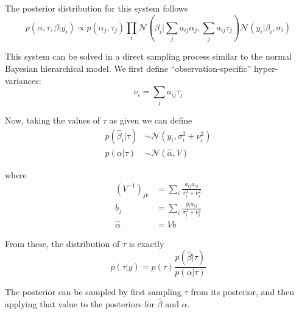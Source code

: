 \documentclass[12pt, oneside]{amsart}
\begin{document}
The posterior distribution for this system follows
\[
p(\alpha, \tau, \beta | y_i) \propto
p(\alpha_j, \tau_j) \prod_i \mathcal{N}\left(\beta_i | \sum_j
  a_{ij} \alpha_j, \sum_j a_{ij} \tau_j\right)
\mathcal{N}\left(y_i | \beta_i, \sigma_i\right)
\]

This system can be solved in a direct sampling process similar to the normal
Bayesian hierarchical model.  We first define ``observation-specific''
hyper-variances:
\[
\nu_i = \sum_j a_{ij} \tau_j
\]

Now, taking the values of $\tau$ as given we can define
\begin{align*}
  p(\hat\beta_i | \tau) & \sim \mathcal{N}\left(y_i, \sigma_i^2 +
                              \nu_i^2\right) \\
  p(\alpha | \tau) & \sim \mathcal{N}\left(\hat\alpha, V\right)
\end{align*}

where
\begin{align*}
  \left(V^{-1}\right)_{jk} &= \sum_i \frac{a_{ij} a_{ik}}{\sigma_i^2 +
                             \nu_i^2} \\
  b_j &= \sum_i \frac{y_i a_{ij}}{\sigma_i^2 + \nu_i^2} \\
  \hat\alpha &= V b
\end{align*}

From these, the distribution of $\tau$ is exactly
\[
p(\tau | y) = p(\tau) \frac{p(\hat\beta | \tau)}{p(\alpha | \tau)}
\]

The posterior can be sampled by first sampling $\tau$ from its
posterior, and then applying that value to the posteriors for
$\hat\beta$ and $\alpha$.
\end{document}
